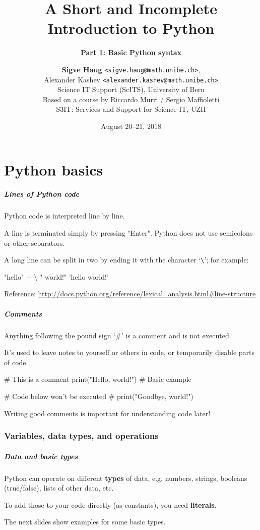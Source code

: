 \documentclass[english,serif,mathserif,xcolor=pdftex,dvipsnames,table]{beamer}
\title[1. Basics]{%
  A Short and Incomplete Introduction to Python
}
\subtitle{\bfseries Part 1: Basic Python syntax}
\author[S.~Haug]{%
  \textbf{Sigve Haug} \texttt{<sigve.haug@math.unibe.ch>}, \\
  Alexander Kashev \texttt{<alexander.kashev@math.unibe.ch>} \\
  Science IT Support (ScITS), University of Bern \\
  \medskip
  Based on a course by Riccardo Murri / Sergio Maffioletti
  \\
  S3IT: Services and Support for Science IT, UZH
}
\date{August 20--21, 2018}
\begin{document}
\maketitle

\part{Python basics}

\begin{frame}[fragile]
  \frametitle{Lines of Python code}
  Python code is interpreted line by line.

  \+
  A line is terminated simply by pressing "Enter".
  Python does not use semicolons or other separators.

  \+
  A long line can be split in two by ending it with the
  character `\texttt{\textbackslash}'; for example:
\begin{semiverbatim}
\In "hello" + \textbackslash
\Ct " world!"
\Out 'hello world!'
\end{semiverbatim}

  \+\scriptsize
  Reference:
  \url{http://docs.python.org/reference/lexical_analysis.html#line-structure}
\end{frame}


\begin{frame}[fragile]
  \frametitle{Comments}
  Anything following the pound sign `\#' is a comment
  and is not executed.

  \+
  It's used to leave notes to yourself or others in code,
  or temporarily disable parts of code.

\begin{semiverbatim}
# This is a comment
print("Hello, world!") # Basic example

# Code below won't be executed
# print("Goodbye, world!")
\end{semiverbatim}

  Writing good comments is important for understanding code later!
\end{frame}


\section{Variables, data types, and operations}

\begin{frame}[fragile]
  \frametitle{Data and basic types}

  Python can operate on different \textbf{types} of data,
  e.g. numbers, strings, booleans (true/false), lists of other data, etc.
  
  \+
  To add those to your code directly (as constants),
  you need \textbf{literals}.

  \+
  The next slides show examples for some basic types.
\end{frame}
\end{document}
